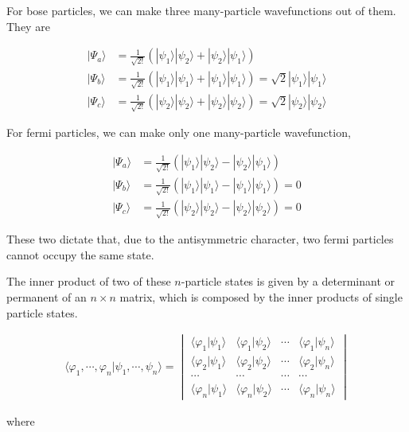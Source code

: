 For bose particles, we can make three many-particle wavefunctions out of them. They are

\[\begin{split}
|\Psi_a\rangle &= \frac{1}{\sqrt{2!}}(|\psi_1\rangle|\psi_2\rangle + |\psi_2\rangle|\psi_1\rangle)\\
|\Psi_b\rangle &= \frac{1}{\sqrt{2!}}(|\psi_1\rangle|\psi_1\rangle + |\psi_1\rangle|\psi_1\rangle) = \sqrt{2}|\psi_1\rangle|\psi_1\rangle\\
|\Psi_c\rangle &= \frac{1}{\sqrt{2!}}(|\psi_2\rangle|\psi_2\rangle + |\psi_2\rangle|\psi_2\rangle) = \sqrt{2}|\psi_2\rangle|\psi_2\rangle
\end{split} \]

For fermi particles, we can make only one many-particle wavefunction, 

\[\begin{split}
|\Psi_a\rangle &= \frac{1}{\sqrt{2!}}(|\psi_1\rangle|\psi_2\rangle - |\psi_2\rangle|\psi_1\rangle) \\
|\Psi_b\rangle &= \frac{1}{\sqrt{2!}}(|\psi_1\rangle|\psi_1\rangle - |\psi_1\rangle|\psi_1\rangle) = 0 \\
|\Psi_c\rangle &= \frac{1}{\sqrt{2!}}(|\psi_2\rangle|\psi_2\rangle - |\psi_2\rangle|\psi_2\rangle) = 0 
\end{split}\] 

These two dictate that, due to the antisymmetric character, two fermi particles cannot occupy the same state. 

The inner product of two of these $n$-particle states is given by a determinant or permanent of an $n\times n$ matrix, which is composed by the inner products of single particle states. 

\begin{align}
\langle\varphi_1,\cdots,\varphi_n|\psi_1,\cdots,\psi_n\rangle = \begin{vmatrix}
\langle \varphi_1|\psi_1\rangle & \langle \varphi_1|\psi_2\rangle & \cdots & \langle \varphi_1|\psi_n\rangle\\
\langle \varphi_2|\psi_1\rangle & \langle \varphi_2|\psi_2\rangle & \cdots & \langle \varphi_2|\psi_n\rangle\\
\cdots & \cdots & \cdots & \cdots\\
\langle \varphi_n|\psi_1\rangle & \langle \varphi_n|\psi_2\rangle & \cdots & \langle \varphi_n|\psi_n\rangle
\end{vmatrix}
\end{align}

where 

